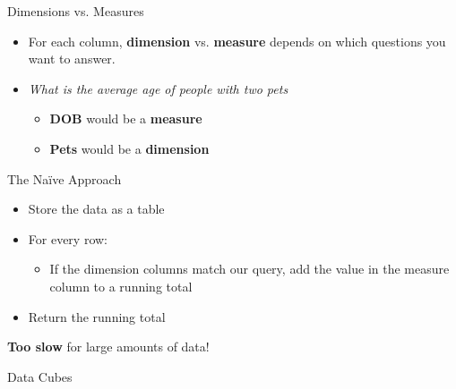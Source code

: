 \documentclass{beamer}
\theoremstyle{definition}
\theoremstyle{definition}
\begin{document}
\begin{frame}{Dimensions vs. Measures}
    \begin{itemize}
        \item For each column, \textbf{dimension} vs. \textbf{measure} depends on which questions you want to answer.
        \item \textit{What is the average age of people with two pets}
        \begin{itemize}
            \item \textbf{DOB} would be a \textbf{measure}
            \item \textbf{Pets} would be a \textbf{dimension}
        \end{itemize}
    \end{itemize}
\end{frame}

\begin{frame}{The Na\"{i}ve Approach}
    \begin{itemize}
        \item Store the data as a table
        \item For every row:
        \begin{itemize}
            \item If the dimension columns match our query, add the value in the measure column to a running total
        \end{itemize}
        \item Return the running total
    \end{itemize}
    \textbf{Too slow} for large amounts of data!
\end{frame}

\begin{frame}{Data Cubes}

\end{frame}
\end{document}
